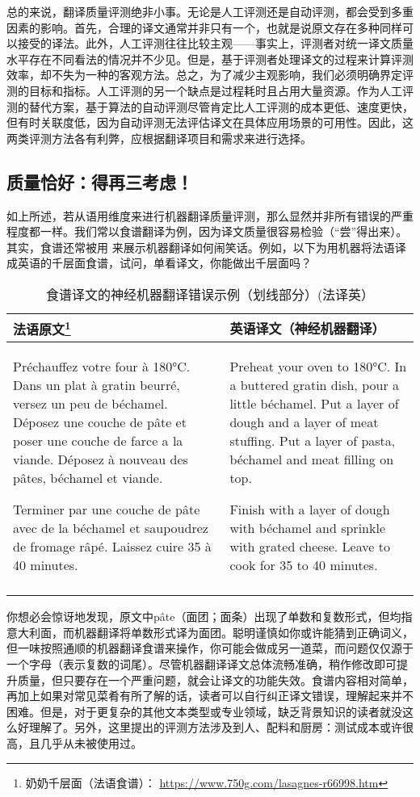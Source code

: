 \documentclass[output=paper]{langscibook}
\begin{document}
总的来说，翻译质量评测绝非小事。无论是人工评测还是自动评测，都会受到多重因素的影响。首先，合理的译文通常并非只有一个，也就是说原文存在多种同样可以接受的译法。此外，人工评测往往比较主观——事实上，评测者对统一译文质量水平存在不同看法的情况并不少见。但是，基于评测者处理译文的过程来计算评测效率，却不失为一种的客观方法。总之，为了减少主观影响，我们必须明确界定评测的目标和指标。人工评测的另一个缺点是过程耗时且占用大量资源。作为人工评测的替代方案，基于算法的自动评测尽管肯定比人工评测的成本更低、速度更快，但有时关联度低，因为自动评测无法评估译文在具体应用场景的可用性。因此，这两类评测方法各有利弊，应根据翻译项目和需求来进行选择。

\subsection{质量恰好：得再三考虑！}

如上所述，若从语用维度来进行机器翻译质量评测，那么显然并非所有错误的严重程度都一样。我们常以食谱翻译为例，因为译文质量很容易检验（“尝”得出来）。其实，食谱还常被用
来展示机器翻译如何闹笑话。例如，以下为用机器将法语译成英语的千层面食谱，试问，单看译文，你能做出千层面吗？


\begin{table}
\begin{tabularx}{\textwidth}{XX}
\lsptoprule
{法语原文\footnote{奶奶千层面（法语食谱）： \url{https://www.750g.com/lasagnes-r66998.htm}}} & {英语译文（神经机器翻译）}\\
\midrule
Préchauffez votre four à 180°C. Dans un plat à gratin beurré, versez un peu de béchamel. Déposez une couche de pâte et poser une couche de farce a la viande. Déposez à nouveau des pâtes, béchamel et viande.

Terminer par une couche de pâte avec de la béchamel et saupoudrez de fromage râpé. Laissez cuire 35 à 40 minutes. & Preheat your oven to 180°C. In a buttered gratin dish, pour a little béchamel. Put a layer of dough and a layer of meat stuffing. Put a layer of pasta, béchamel and meat filling on top.

Finish with a layer of dough with béchamel and sprinkle with grated cheese. Leave to cook for 35 to 40 minutes.\\
\lspbottomrule
\end{tabularx}
\caption{食谱译文的神经机器翻译错误示例（划线部分）(法译英）}
\label{tab:rossi:1}
\end{table}

你想必会惊讶地发现，原文中pâte（面团；面条）出现了单数和复数形式，但均指意大利面，而机器翻译将单数形式译为面团。聪明谨慎如你或许能猜到正确词义，但一味按照通顺的机器翻译食谱来操作，你可能会做成另一道菜，而问题仅仅源于一个字母（表示复数的词尾）。尽管机器翻译译文总体流畅准确，稍作修改即可提升质量，但只要存在一个严重问题，就会让译文的功能失效。食谱内容相对简单，再加上如果对常见菜肴有所了解的话，读者可以自行纠正译文错误，理解起来并不困难。但是，对于更复杂的其他文本类型或专业领域，缺乏背景知识的读者就没这么好理解了。另外，这里提出的评测方法涉及到人、配料和厨房：测试成本或许很高，且几乎从未被使用过。
\end{document}
